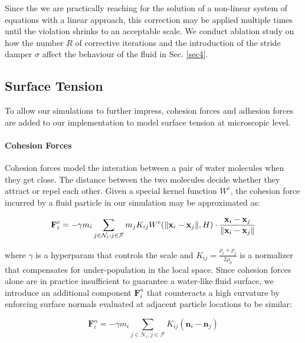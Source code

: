 \documentclass[
	11pt, 
	DIV10,
	ngerman,
	a4paper, 
	oneside, 
	headings=normal, 
	captions=tableheading,
	final, 
	numbers=noenddot
]{scrartcl}
\DeclarePairedDelimiter{\norm}{\lVert}{\rVert}
\begin{document}
Since the we are practically reaching for the solution of a non-linear system of equations with a linear approach, this correction may be applied multiple times until the violation shrinks to an acceptable scale. We conduct ablation study on how the number $ R $ of corrective iterations and the introduction of the stride damper $ \sigma $ affect the behaviour of the fluid in Sec. \ref{sec4}.

\subsection{Surface Tension}

To allow our simulations to further impress, cohesion forces and adhesion forces are added to our implementation to model surface tension at microscopic level.

\paragraph{Cohesion Forces}

Cohesion forces model the interation between a pair of water molecules when they get close. The distance between the two molecules decide whether they attract or repel each other. Given a special kernel function $ W^{c} $, the cohesion force incurred by a fluid particle in our simulation may be approximated as:

\begin{equation}
	\label{eq25}
	\mathbf{F}_{i}^{c} = - \gamma m_{i} \sum_{j \in \mathcal{N}_{i}:j \in \mathcal{F}} m_j K_{ij} W^{c}(\norm{\mathbf{x}_{i} - \mathbf{x}_{j}}, H) \cdot \frac{\mathbf{x}_{i} - \mathbf{x}_{j}}{\norm{\mathbf{x}_{i} - \mathbf{x}_{j}}}
\end{equation}

where $ \gamma $ is a hyperparam that controls the scale and $ K_{ij} = \frac{\rho_{i} + \rho_{j}}{2\rho_{0}} $ is a normalizer that compensates for under-population in the local space. Since cohesion forces alone are in practice insufficient to guarantee a water-like fluid surface, we introduce an additional component $ \mathbf{F}_{i}^{n} $ that counteracts a high curvature by enforcing surface normals evaluated at adjacent particle locations to be similar:

\begin{equation}
	\label{eq26}
	\mathbf{F}_{i}^{n} = - \gamma m_{i} \sum_{j \in \mathcal{N}_{i}:j \in \mathcal{F}} K_{ij} (\mathbf{n}_{i} - \mathbf{n}_{j})
\end{equation}
\end{document}
